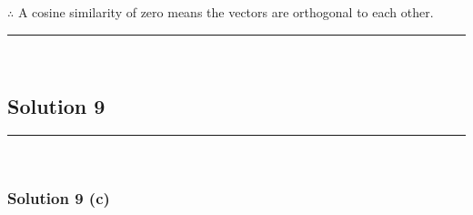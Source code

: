 \documentclass{article}
\begin{document}
\subsubsection*{\normalfont}{$\therefore$ A cosine similarity of zero means the vectors are orthogonal to each other.}

\noindent\rule{\textwidth}{0.4pt}\\

\newpage
\subsection*{Solution 9}
\noindent\rule{\textwidth}{0.4pt}\\
\subsubsection*{Solution 9 (c)}
\end{document}
